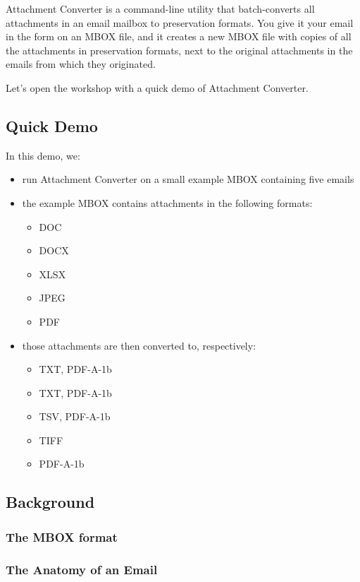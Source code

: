 \documentclass[11pt]{article}
\begin{document}
Attachment Converter is a command-line utility that batch-converts all
attachments in an email mailbox to preservation formats.  You give it
your email in the form on an MBOX file, and it creates a new MBOX file
with copies of all the attachments in preservation formats, next to
the original attachments in the emails from which they originated.

Let's open the workshop with a quick demo of Attachment Converter.

\subsection{Quick Demo}
\label{sec:org9154436}

In this demo, we:

\begin{itemize}
\item run Attachment Converter on a small example MBOX containing five
emails
\item the example MBOX contains attachments in the following formats:
\begin{itemize}
\item DOC
\item DOCX
\item XLSX
\item JPEG
\item PDF
\end{itemize}
\item those attachments are then converted to, respectively:
\begin{itemize}
\item TXT, PDF-A-1b
\item TXT, PDF-A-1b
\item TSV, PDF-A-1b
\item TIFF
\item PDF-A-1b
\end{itemize}
\end{itemize}

\subsection{Background}
\label{sec:org58d0a81}



\subsubsection{The MBOX format}
\label{sec:orged2aee8}

\subsubsection{The Anatomy of an Email}
\label{sec:orgf0f4c4e}
\end{document}
